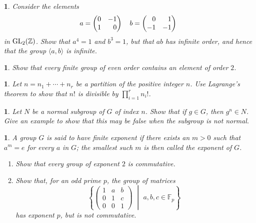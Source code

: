 \documentclass[a4paper,11pt,final]{memoir}%
\newtheorem{exercise}[Y]{}
\theoremstyle{nonumberplain}
\begin{document}
\begin{exercise}
\label{x2} Consider the elements%
\[
a=%
\begin{pmatrix}
0 & -1\\
1 & \hfill\hfill0
\end{pmatrix}
\quad b=%
\begin{pmatrix}
\hfill0 & \hfill1\\
-1 & -1
\end{pmatrix}
\]
in $\operatorname{GL}_{2}(\mathbb{Z})$. Show that $a^{4}=1$ and $b^{3}=1$, but that $ab$ has
infinite order, and hence that the group $\langle a,b\rangle$ is infinite.

\end{exercise}

\begin{exercise}
\label{x3} Show that every finite group of even order contains an element of
order $2$.
\end{exercise}

\begin{exercise}
\label{x4d}Let $n=n_{1}+\cdots+n_{r}$ be a partition of the positive integer
$n$. Use Lagrange's theorem to show that $n!$ is divisible by $\prod
\nolimits_{i=1}^{r}n_{i}!$.
\end{exercise}

\begin{exercise}
\label{x4} Let $N$ be a normal subgroup of $G$ of index $n$. Show that if
$g\in G$, then $g^{n}\in N$. Give an example to show that this may be false
when the subgroup is not normal.
\end{exercise}

\begin{exercise}
\label{x4a} A group $G$ is said to have \emph{finite exponent}%
if there exists an $m>0$ such that $a^{m}=e$ for every $a$ in $G$; the
smallest such $m$ is then called the \emph{exponent} of $G$.

\begin{enumerate}
\item Show that every group of exponent $2$ is commutative.

\item Show that, for an odd prime $p$, the group of matrices
\[
\left\{
\begin{pmatrix}
1 & a & b\\
0 & 1 & c\\
0 & 0 & 1
\end{pmatrix}
\,\, \middle|\,\, a,b,c\in\mathbb{F}{}_{p}\right\}
\]
has exponent $p$, but is not commutative.
\end{enumerate}
\end{exercise}
\end{document}
